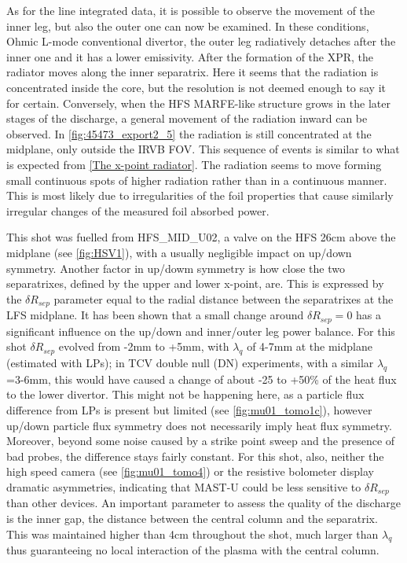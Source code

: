 As for the line integrated data, it is possible to observe the movement of the inner leg, but also the outer one can now be examined. In these conditions, Ohmic L-mode conventional divertor, the outer leg radiatively detaches after the inner one and it has a lower emissivity. After the formation of the XPR, the radiator moves along the inner separatrix. Here it seems that the radiation is concentrated inside the core, but the resolution is not deemed enough to say it for certain. Conversely, when the HFS MARFE-like structure grows in the later stages of the discharge, a general movement of the radiation inward can be observed. In \autoref{fig:45473_export2_5} the radiation is still concentrated at the midplane, only outside the IRVB FOV. This sequence of events is similar to what is expected from \autoref{The x-point radiator}. %
The radiation seems to move forming small continuous spots of higher radiation rather than in a continuous manner. This is most likely due to irregularities of the foil properties that cause similarly irregular changes of the measured foil absorbed power.

This shot was fuelled from HFS\_MID\_U02, a valve on the HFS 26cm above the midplane (see \autoref{fig:HSV1}), with a usually negligible impact on up/down symmetry. Another factor in up/dowm symmetry is how close the two separatrixes, defined by the upper and lower x-point, are. This is expressed by the $\delta R_{sep}$ parameter equal to the radial distance between the separatrixes at the LFS midplane. It has been shown that a small change around $\delta R_{sep}=0$ has a significant influence on the up/down and inner/outer leg power balance.\cite{Fevrier2021} For this shot $\delta R_{sep}$ evolved from -2mm to +5mm, with $\lambda_q$ of 4-7mm at the midplane (estimated with LPs\cite{Ryan2023}); in TCV double null (DN) experiments, with a similar $\lambda_q$=3-6mm, this would have caused a change of about -25 to +50\% of the heat flux to the lower divertor.\cite{Potzel2014} This might not be happening here, as a particle flux difference from LPs is present but limited (see \autoref{fig:mu01_tomo1c}), however up/down particle flux symmetry does not necessarily imply heat flux symmetry. Moreover, beyond some noise caused by a strike point sweep and the presence of bad probes, the difference stays fairly constant.  %
For this shot, also, neither the high speed camera (see \autoref{fig:mu01_tomo4}) or the resistive bolometer display dramatic asymmetries, indicating that MAST-U could be less sensitive to $\delta R_{sep}$ than other devices. An important parameter to assess the quality of the discharge is the inner gap, the distance between the central column and the separatrix. This was maintained higher than 4cm throughout the shot, much larger than $\lambda_q$ thus guaranteeing no local interaction of the plasma with the central column.

